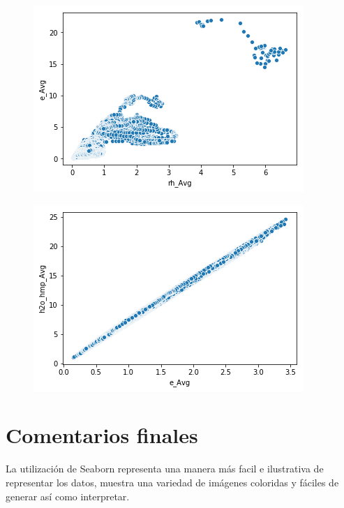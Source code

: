 \documentclass[11pt, spanish]{report}
\begin{document}
\begin{figure}
\centering
\begin{minipage}{.5\textwidth}
  \centering
  \includegraphics[width=\linewidth]{7.png}
  \label{fig:test1}
\end{minipage}%
\begin{minipage}{.5\textwidth}
  \centering
  \includegraphics[width=\linewidth]{8.png}
  \label{fig:test2}
\end{minipage}
\end{figure}
\section{Comentarios finales}
La utilización de Seaborn representa una manera más facil e ilustrativa de representar los datos, muestra una variedad de imágenes coloridas y fáciles de generar así como interpretar.
\end{document}
